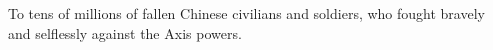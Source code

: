 \begin{dedication}
To tens of millions of fallen Chinese civilians and soldiers, who fought bravely and selflessly against the Axis powers.
\end{dedication}